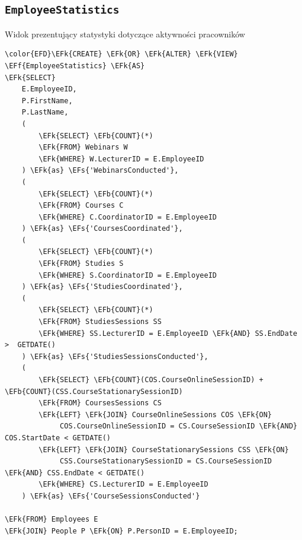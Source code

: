 \documentclass[11pt]{article}
\newcommand{\EFs}[1]{\textcolor{EFs}{#1}} %
\newcommand{\EFk}[1]{\textcolor{EFk}{\textbf{#1}}} %
\newcommand{\EFb}[1]{\textcolor{EFb}{\textbf{#1}}} %
\newcommand{\EFf}[1]{\textcolor{EFf}{#1}} %
\begin{document}
\subsection{\texttt{EmployeeStatistics}}
\label{sec:org5d978ad}
Widok prezentujący statystyki dotyczące aktywności pracowników
\begin{Code}
\begin{Verbatim}
\color{EFD}\EFk{CREATE} \EFk{OR} \EFk{ALTER} \EFk{VIEW} \EFf{EmployeeStatistics} \EFk{AS}
\EFk{SELECT} 
    E.EmployeeID,
    P.FirstName, 
    P.LastName,
    (
        \EFk{SELECT} \EFb{COUNT}(*)
        \EFk{FROM} Webinars W
        \EFk{WHERE} W.LecturerID = E.EmployeeID
    ) \EFk{as} \EFs{'WebinarsConducted'},
    (
        \EFk{SELECT} \EFb{COUNT}(*)
        \EFk{FROM} Courses C
        \EFk{WHERE} C.CoordinatorID = E.EmployeeID
    ) \EFk{as} \EFs{'CoursesCoordinated'},
    (
        \EFk{SELECT} \EFb{COUNT}(*)
        \EFk{FROM} Studies S 
        \EFk{WHERE} S.CoordinatorID = E.EmployeeID
    ) \EFk{as} \EFs{'StudiesCoordinated'},
    (
        \EFk{SELECT} \EFb{COUNT}(*)
        \EFk{FROM} StudiesSessions SS
        \EFk{WHERE} SS.LecturerID = E.EmployeeID \EFk{AND} SS.EndDate >  GETDATE()
    ) \EFk{as} \EFs{'StudiesSessionsConducted'},
    (
        \EFk{SELECT} \EFb{COUNT}(COS.CourseOnlineSessionID) + \EFb{COUNT}(CSS.CourseStationarySessionID)
        \EFk{FROM} CoursesSessions CS 
        \EFk{LEFT} \EFk{JOIN} CourseOnlineSessions COS \EFk{ON}
             COS.CourseOnlineSessionID = CS.CourseSessionID \EFk{AND} COS.StartDate < GETDATE()
        \EFk{LEFT} \EFk{JOIN} CourseStationarySessions CSS \EFk{ON} 
             CSS.CourseStationarySessionID = CS.CourseSessionID \EFk{AND} CSS.EndDate < GETDATE()
        \EFk{WHERE} CS.LecturerID = E.EmployeeID
    ) \EFk{as} \EFs{'CourseSessionsConducted'}

\EFk{FROM} Employees E 
\EFk{JOIN} People P \EFk{ON} P.PersonID = E.EmployeeID;
\end{Verbatim}
\end{Code}
\end{document}
